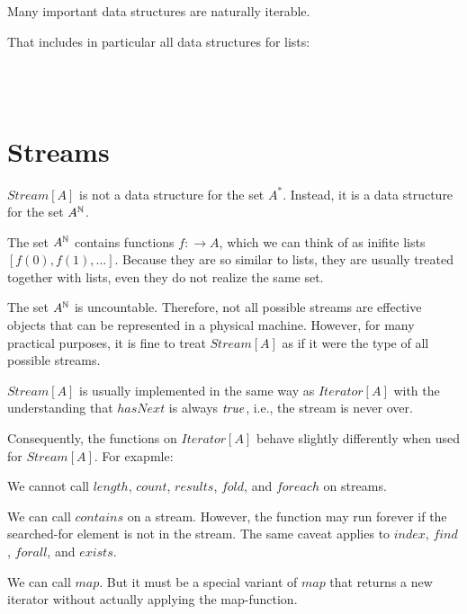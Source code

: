 Many important data structures are naturally iterable.

That includes in particular all data structures for lists:
\begin{acode}
\\
\\
\end{acode}


\section{Streams}

$Stream[A]$ is not a data structure for the set $A^*$.
Instead, it is a data structure for the set $A^{\mathbb{N}}$.

The set $A^{\mathbb{N}}$ contains functions $f:\to A$, which we can think of as inifite lists $[f(0),f(1),\ldots]$.
Because they are so similar to lists, they are usually treated together with lists, even they do not realize the same set.

The set $A^{\mathbb{N}}$ is uncountable.
Therefore, not all possible streams are effective objects that can be represented in a physical machine.
However, for many practical purposes, it is fine to treat $Stream[A]$ as if it were the type of all possible streams.

$Stream[A]$ is usually implemented in the same way as $Iterator[A]$ with the understanding that $hasNext$ is always $\mathit{true}$, i.e., the stream is never over.

Consequently, the functions on $Iterator[A]$ behave slightly differently when used for $Stream[A]$.
For exapmle:
\begin{compactitem}
 \item We cannot call $length$, $count$, $results$, $fold$, and $foreach$ on streams.
 \item We can call $contains$ on a stream. However, the function may run forever if the searched-for element is not in the stream.
 The same caveat applies to $index$, $find$, $forall$, and $exists$.
 \item We can call $map$. But it must be a special variant of $map$ that returns a new iterator without actually applying the map-function.
\end{compactitem}

